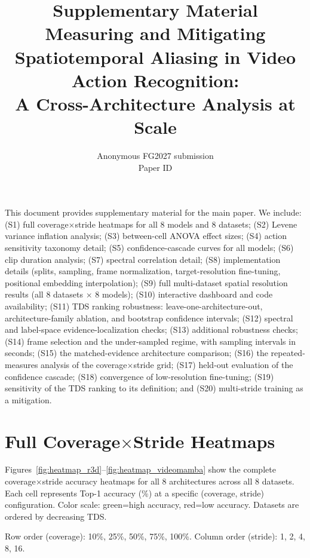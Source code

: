 \documentclass[a4paper, 10pt, conference, onecolumn]{ieeeconf}
\title{\LARGE \bf
Supplementary Material\\[2pt]
\Large Measuring and Mitigating Spatiotemporal Aliasing in Video Action Recognition:\\
A Cross-Architecture Analysis at Scale
}
\author{Anonymous FG2027 submission\\ Paper ID \FGPaperID \\}
\newcommand{\TDS}{\textsc{TDS}}
\begin{document}
\pagestyle{plain}
\maketitle

\renewcommand\thesection{S\arabic{section}}
\renewcommand\thefigure{S\arabic{figure}}
\renewcommand\thetable{S\arabic{table}}

This document provides supplementary material for the main paper. We include: (S1) full coverage$\times$stride heatmaps for all 8 models and 8 datasets; (S2) Levene variance inflation analysis; (S3) between-cell ANOVA effect sizes; (S4) action sensitivity taxonomy detail; (S5) confidence-cascade curves for all models; (S6) clip duration analysis; (S7) spectral correlation detail; (S8) implementation details (splits, sampling, frame normalization, target-resolution fine-tuning, positional embedding interpolation); (S9) full multi-dataset spatial resolution results (all 8 datasets $\times$ 8 models); (S10) interactive dashboard and code availability; (S11) \TDS{} ranking robustness: leave-one-architecture-out, architecture-family ablation, and bootstrap confidence intervals; (S12) spectral and label-space evidence-localization checks; (S13) additional robustness checks; (S14) frame selection and the under-sampled regime, with sampling intervals in seconds; (S15) the matched-evidence architecture comparison; (S16) the repeated-measures analysis of the coverage$\times$stride grid; (S17) held-out evaluation of the confidence cascade; (S18) convergence of low-resolution fine-tuning; (S19) sensitivity of the \TDS{} ranking to its definition; and (S20) multi-stride training as a mitigation.

\section{Full Coverage$\times$Stride Heatmaps}
\label{sec:sup_heatmaps}

Figures~\ref{fig:heatmap_r3d}--\ref{fig:heatmap_videomamba} show the complete coverage$\times$stride accuracy heatmaps for all 8 architectures across all 8 datasets. Each cell represents Top-1 accuracy (\%) at a specific (coverage, stride) configuration. Color scale: green=high accuracy, red=low accuracy. Datasets are ordered by decreasing \TDS{}.

Row order (coverage): 10\%, 25\%, 50\%, 75\%, 100\%. Column order (stride): 1, 2, 4, 8, 16.
\end{document}
